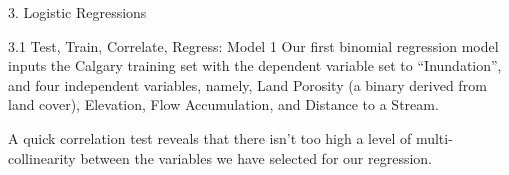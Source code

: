 \documentclass[
  ignorenonframetext,
]{beamer}
\newenvironment{Shaded}{\begin{snugshade}}{\end{snugshade}}
\newcommand{\AttributeTok}[1]{\textcolor[rgb]{0.77,0.63,0.00}{#1}}
\newcommand{\ConstantTok}[1]{\textcolor[rgb]{0.00,0.00,0.00}{#1}}
\newcommand{\DecValTok}[1]{\textcolor[rgb]{0.00,0.00,0.81}{#1}}
\newcommand{\DocumentationTok}[1]{\textcolor[rgb]{0.56,0.35,0.01}{\textbf{\textit{#1}}}}
\newcommand{\FunctionTok}[1]{\textcolor[rgb]{0.00,0.00,0.00}{#1}}
\newcommand{\NormalTok}[1]{#1}
\newcommand{\OtherTok}[1]{\textcolor[rgb]{0.56,0.35,0.01}{#1}}
\newcommand{\SpecialCharTok}[1]{\textcolor[rgb]{0.00,0.00,0.00}{#1}}
\begin{document}
\begin{frame}[fragile]{3. Logistic Regressions}
\protect\hypertarget{logistic-regressions}{}
\begin{block}{3.1 Test, Train, Correlate, Regress: Model 1}
\protect\hypertarget{test-train-correlate-regress-model-1}{}
Our first binomial regression model inputs the Calgary training set with
the dependent variable set to ``Inundation'', and four independent
variables, namely, Land Porosity (a binary derived from land cover),
Elevation, Flow Accumulation, and Distance to a Stream.

\begin{Shaded}
\end{Shaded}

A quick correlation test reveals that there isn't too high a level of
multi-collinearity between the variables we have selected for our
regression.


\end{block}
\end{frame}
\end{document}
